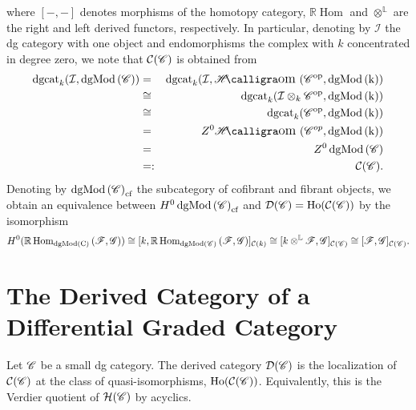 \documentclass[dissertation.tex]{subfiles}
\begin{document}
\begin{rmk}
\begin{itemize}
    where $[-,-]$ denotes morphisms of the homotopy category, $\mathbb{R}\operatorname{Hom}$ and $\otimes^\mathbb{L}$ are the right and left derived functors, respectively.
    In particular, denoting by $\mathcal{I}$ the dg category with one object and endomorphisms the complex with $k$ concentrated in degree zero, we note that $\mathcal{C}(\mathscr{C})$ is obtained from
    \begin{eqnarray*}
      \dgcat_k(\mathcal{I}, \cdg{\CC}) &=& \dgcat_k(\mathcal{I}, \SHom{\CC^\text{op}, \cdg{k}}\\
      &\cong& \dgcat_k(\mathcal{I} \otimes_k \CC^\text{op}, \cdg{k})\\
      &\cong& \dgcat_k(\CC^\text{op}, \cdg{k})\\
      &=& Z^0 \SHom{\CC^{op}, \cdg{k}}\\
      &=& Z^0\cdg{\CC}\\
      &=:& \mathcal{C}(\CC).
    \end{eqnarray*}
    Denoting by $\operatorname{dgMod\left(\mathscr{C}\right)}_\text{cf}$ the subcategory of cofibrant and fibrant objects, we obtain an equivalence between $H^0\operatorname{dgMod\left(\mathscr{C}\right)}_\text{cf}$ and $\mathcal{D}(\mathscr{C}) = \operatorname{Ho}(\mathcal{C}(\mathscr{C}))$ by the isomorphism
    $$H^0(\mathbb{R}\operatorname{Hom}_{\operatorname{dgMod\left(C\right)}}\left(\mathscr{F},\mathscr{G}\right)) \cong [k,\mathbb{R}\operatorname{Hom}_{\operatorname{dgMod\left(\mathscr{C}\right)}}\left(\mathscr{F},\mathscr{G}\right)]_{\mathcal{C}(k)} \cong [k \otimes^\mathbb{L} \mathscr{F}, \mathscr{G}]_{\mathcal{C}(\mathscr{C})} \cong [\mathscr{F},\mathscr{G}]_{\mathcal{C}(\mathscr{C})}.$$
  \end{itemize}
\end{rmk}


\section{The Derived Category of a Differential Graded Category}

\begin{defn}
  Let $\mathscr{C}$ be a small dg category.
  The derived category $\mathcal{D}(\mathscr{C})$ is the localization of $\mathcal{C}(\mathscr{C})$ at the class of quasi-isomorphisms, $\operatorname{Ho}(\mathcal{C}(\mathscr{C}))$.
  Equivalently, this is the Verdier quotient of $\mathcal{H}(\mathscr{C})$ by acyclics.
\end{defn}
\end{document}
